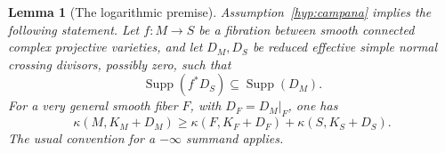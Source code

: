 \documentclass[11pt,letterpaper]{article}
\newtheorem{lemma}[theorem]{Lemma}
\theoremstyle{definition}
\theoremstyle{remark}
\begin{document}
\begin{lemma}[The logarithmic premise]\label{red:log-iitaka}
Assumption~\ref{hyp:campana} implies the following statement. Let
\(f:M\to S\) be a fibration between smooth connected complex projective
varieties, and let \(D_M,D_S\) be reduced effective simple normal crossing
divisors, possibly zero, such that
\begin{equation}\label{red:boundary-compatibility}
 \operatorname{Supp}(f^*D_S)\subseteq\operatorname{Supp}(D_M).
\end{equation}
For a very general smooth fiber \(F\), with \(D_F=D_M|_F\), one has
\begin{equation}\label{red:log-iitaka-inequality}
 \kappa(M,K_M+D_M)
 \geq \kappa(F,K_F+D_F)+\kappa(S,K_S+D_S).
\end{equation}
The usual convention for a \(-\infty\) summand applies.
\end{lemma}
\end{document}
